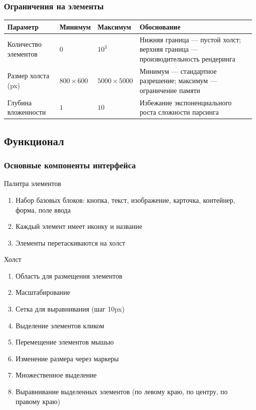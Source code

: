 \documentclass[14pt,a4paper]{extarticle}
\begin{document}
{\subsubsection{Ограничения на элементы}

\begin{tabular}{|p{3.5cm}|p{2.2cm}|p{3cm}|p{5.5cm}|}
\hline
\textbf{Параметр} & \textbf{Минимум} & \textbf{Максимум} & \textbf{Обоснование} \\
\hline
Количество элементов 
    & \(0\) 
    & \(10^{3}\) 
    & Нижняя граница — пустой холст; верхняя граница — производительность рендеринга \\
\hline
Размер холста (px) 
    & \(800 \times 600\) 
    & \(5000 \times 5000\) 
    & Минимум — стандартное разрешение; максимум — ограничение памяти \\
\hline
Глубина вложенности 
    & \(1\) 
    & \(10\) 
    & Избежание экспоненциального роста сложности парсинга \\
\hline
\end{tabular}


\subsection{Функционал}
{

\subsubsection {Основные компоненты интерфейса}
{
Палитра элементов

\begin{enumerate}
    \item Набор базовых блоков: кнопка, текст, изображение, карточка, контейнер, форма, поле ввода
    \item Каждый элемент имеет иконку и название
    \item Элементы перетаскиваются на холст
\end{enumerate}

Холст

\begin{enumerate}
    \item Область для размещения элементов
    \item Масштабирование
    \item Сетка для выравнивания (шаг 10px)
    \item Выделение элементов кликом
    \item Перемещение элементов мышью
    \item Изменение размера через маркеры
    \item Множественное выделение
    \item Выравнивание выделенных элементов (по левому краю, по центру, по правому краю)
\end{enumerate}

}}}
\end{document}
